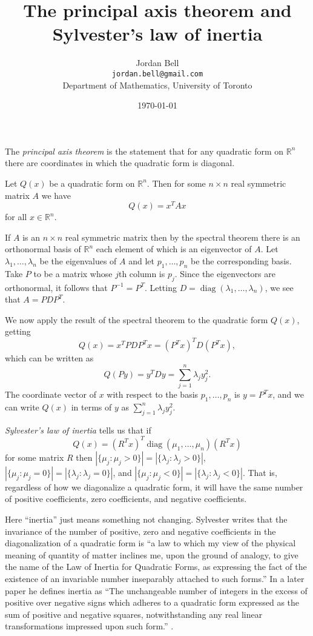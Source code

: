 \documentclass{article}
\newcommand{\diag}{\operatorname{diag}}
\begin{document}
\title{The principal axis theorem and Sylvester's law of inertia}
\author{Jordan Bell\\ \texttt{jordan.bell@gmail.com}\\Department of Mathematics, University of Toronto}
\date{\today}              

\maketitle

 The {\em principal axis theorem} is the statement that for any quadratic form on $\mathbb{R}^n$ there
 are coordinates in which the quadratic form is diagonal.

Let $Q(x)$ be a quadratic form on $\mathbb{R}^n$. Then for some $n \times n$ real symmetric matrix $A$ we have 
\[
Q(x)=x^T Ax
\]
for all $x \in \mathbb{R}^n$. 

If $A$ is an $n \times n$ real symmetric matrix then by the spectral theorem there is an orthonormal basis of $\mathbb{R}^n$ each element of which is an eigenvector of $A$. Let $\lambda_1,\ldots,\lambda_n$ be
the eigenvalues of $A$ and let $p_1,\ldots,p_n$ be the corresponding basis. Take $P$ to be a matrix whose $j$th column is $p_j$. Since the eigenvectors are orthonormal, it follows that $P^{-1}=P^T$. Letting $D=\diag(\lambda_1,\ldots,\lambda_n)$, we see that $A=PDP^T$.

We now apply the result of the spectral theorem to the quadratic form $Q(x)$, getting
\[
Q(x)=x^T PDP^T x = (P^T x)^T D (P^T x),
\]
which can be written as
\[
Q(Py)=y^T D y = \sum_{j=1}^n \lambda_j y_j^2.
\]
The coordinate vector of $x$ with respect to the basis $p_1,\ldots,p_n$ is
$y=P^T x$, and we can write $Q(x)$ in terms of $y$ as $\sum_{j=1}^n \lambda_j y_j^2$.

{\em Sylvester's law of inertia} tells us that if
\[
Q(x)=(R^T x)^T \diag(\mu_1,\ldots,\mu_n) (R^T x)
\] 
for some matrix $R$ then
$|\{\mu_j: \mu_j >0\}|=|\{\lambda_j:\lambda_j>0\}|$,
$|\{\mu_j: \mu_j =0\}|=|\{\lambda_j:\lambda_j=0\}|$, and 
$|\{\mu_j: \mu_j <0\}|=|\{\lambda_j:\lambda_j<0\}|$.
That is, regardless of how we diagonalize a quadratic form, it will have the same number of positive coefficients, zero coefficients, and negative coefficients.

Here ``inertia'' just means something not changing. Sylvester writes that the invariance of the number of positive, zero and negative coefficients in the diagonalization of a quadratic form is ``a law to which my view of the physical meaning of quantity of matter inclines me, upon the ground of analogy, to give the name of the Law of Inertia for Quadratic Forms, as expressing the fact of the existence of an invariable number inseparably attached to such forms.'' \cite[p. 142]{sylvester1852} In a later paper he defines inertia as ``The unchangeable number of integers in the excess of positive over negative signs which adheres to a quadratic form expressed as the sum of positive and negative squares, notwithstanding any real linear transformations impressed upon such form.'' \cite[p. 545]{sylvester1853}.



\end{document}
